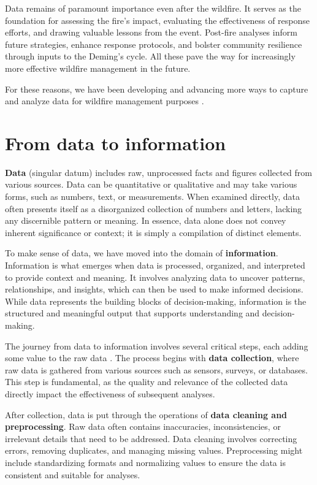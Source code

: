 \documentclass[
  12 pt,
]{Nemilov}
\begin{document}
Data remains of paramount importance even after the wildfire. It serves as the foundation for assessing the fire's impact, evaluating the effectiveness of response efforts, and drawing valuable lessons from the event. Post-fire analyses inform future strategies, enhance response protocols, and bolster community resilience through inputs to the Deming's cycle. All these pave the way for increasingly more effective wildfire management in the future.

For these reasons, we have been developing and advancing more ways to capture and analyze data for wildfire management purposes \citep{artes2019global}.

\section{From data to information}\label{from-data-to-information}

\textbf{Data} (singular datum) includes raw, unprocessed facts and figures collected from various sources. Data can be quantitative or qualitative and may take various forms, such as numbers, text, or measurements. When examined directly, data often presents itself as a disorganized collection of numbers and letters, lacking any discernible pattern or meaning. In essence, data alone does not convey inherent significance or context; it is simply a compilation of distinct elements.

To make sense of data, we have moved into the domain of \textbf{information}. Information is what emerges when data is processed, organized, and interpreted to provide context and meaning. It involves analyzing data to uncover patterns, relationships, and insights, which can then be used to make informed decisions. While data represents the building blocks of decision-making, information is the structured and meaningful output that supports understanding and decision-making.

The journey from data to information involves several critical steps, each adding some value to the raw data \citep{van2016data}. The process begins with \textbf{data collection}, where raw data is gathered from various sources such as sensors, surveys, or databases. This step is fundamental, as the quality and relevance of the collected data directly impact the effectiveness of subsequent analyses.

After collection, data is put through the operations of \textbf{data cleaning and preprocessing}. Raw data often contains inaccuracies, inconsistencies, or irrelevant details that need to be addressed. Data cleaning involves correcting errors, removing duplicates, and managing missing values. Preprocessing might include standardizing formats and normalizing values to ensure the data is consistent and suitable for analyses.
\end{document}
